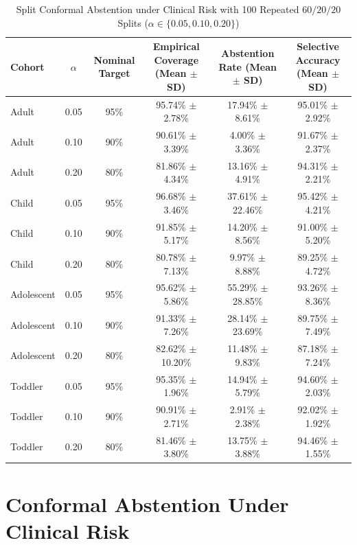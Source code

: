 \documentclass[conference]{IEEEtran}
\begin{document}
\begin{table}[t]
\centering
\caption{Split Conformal Abstention under Clinical Risk with 100 Repeated $60/20/20$ Splits ($\alpha \in \{0.05, 0.10, 0.20\}$)}
\label{tab:conformal_abstention}
\footnotesize
\setlength{\tabcolsep}{3pt}
\begin{tabular*}{\textwidth}{|@{\extracolsep{\fill}}l|c|c|c|c|c|}
\hline
\textbf{Cohort} & $\alpha$ & \textbf{Nominal Target} & \textbf{Empirical Coverage (Mean $\pm$ SD)} & \textbf{Abstention Rate (Mean $\pm$ SD)} & \textbf{Selective Accuracy (Mean $\pm$ SD)} \\
\hline
Adult & 0.05 & 95\% & 95.74\% $\pm$ 2.78\% & 17.94\% $\pm$ 8.61\% & 95.01\% $\pm$ 2.92\% \\
\hline
Adult & 0.10 & 90\% & 90.61\% $\pm$ 3.39\% & 4.00\% $\pm$ 3.36\% & 91.67\% $\pm$ 2.37\% \\
\hline
Adult & 0.20 & 80\% & 81.86\% $\pm$ 4.34\% & 13.16\% $\pm$ 4.91\% & 94.31\% $\pm$ 2.21\% \\
\hline
Child & 0.05 & 95\% & 96.68\% $\pm$ 3.46\% & 37.61\% $\pm$ 22.46\% & 95.42\% $\pm$ 4.21\% \\
\hline
Child & 0.10 & 90\% & 91.85\% $\pm$ 5.17\% & 14.20\% $\pm$ 8.56\% & 91.00\% $\pm$ 5.20\% \\
\hline
Child & 0.20 & 80\% & 80.78\% $\pm$ 7.13\% & 9.97\% $\pm$ 8.88\% & 89.25\% $\pm$ 4.72\% \\
\hline
Adolescent & 0.05 & 95\% & 95.62\% $\pm$ 5.86\% & 55.29\% $\pm$ 28.85\% & 93.26\% $\pm$ 8.36\% \\
\hline
Adolescent & 0.10 & 90\% & 91.33\% $\pm$ 7.26\% & 28.14\% $\pm$ 23.69\% & 89.75\% $\pm$ 7.49\% \\
\hline
Adolescent & 0.20 & 80\% & 82.62\% $\pm$ 10.20\% & 11.48\% $\pm$ 9.83\% & 87.18\% $\pm$ 7.24\% \\
\hline
Toddler & 0.05 & 95\% & 95.35\% $\pm$ 1.96\% & 14.94\% $\pm$ 5.79\% & 94.60\% $\pm$ 2.03\% \\
\hline
Toddler & 0.10 & 90\% & 90.91\% $\pm$ 2.71\% & 2.91\% $\pm$ 2.38\% & 92.02\% $\pm$ 1.92\% \\
\hline
Toddler & 0.20 & 80\% & 81.46\% $\pm$ 3.80\% & 13.75\% $\pm$ 3.88\% & 94.46\% $\pm$ 1.55\% \\
\hline
\end{tabular*}
\vspace{-2mm}
\end{table}

\section{Conformal Abstention Under Clinical Risk}
\end{document}
